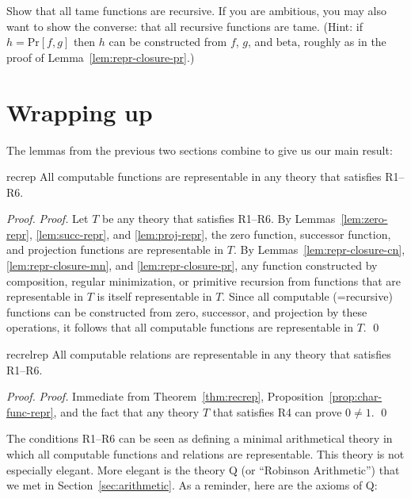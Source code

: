 \begin{exercise}
  Show that all tame functions are recursive.
  If you are ambitious, you may also want to show
  the converse: that all recursive functions are tame.
  (Hint: if $h = \mathrm{Pr}[f,g]$ then $h$ can be constructed from $f$, $g$, and $\mathrm{beta}$, roughly as in the proof of Lemma~\ref{lem:repr-closure-pr}.)
\end{exercise}

\section{Wrapping up}

The lemmas from the previous two sections combine to give us our main result:

\begin{theorem}{}{recrep}
  All computable functions are representable in any theory that satisfies R1--R6.
\end{theorem}
\begin{proof}
  \emph{Proof.}
  Let $T$ be any theory that satisfies R1--R6.
  By Lemmas~\ref{lem:zero-repr}, \ref{lem:succ-repr}, and \ref{lem:proj-repr},
  the zero function, successor function, and projection functions
  are representable in $T$.
  By Lemmas~\ref{lem:repr-closure-cn}, \ref{lem:repr-closure-mn},
  and \ref{lem:repr-closure-pr},
  any function constructed
  by composition, regular minimization, or primitive recursion
  from functions that are representable in $T$
  is itself representable in $T$.
  Since all computable (=recursive) functions can be constructed
  from zero, successor, and projection by these operations,
  it follows that all computable functions are representable in $T$.
  \qed
\end{proof}

\begin{theorem}{}{recrelrep}
  All computable relations are representable in any theory that satisfies R1--R6.
\end{theorem}
\begin{proof}
  \emph{Proof.}
  Immediate from Theorem~\ref{thm:recrep},
  Proposition~\ref{prop:char-func-repr},
  and the fact that any theory $T$ that satisfies R4 can prove $0 \neq \num{1}$.
  \qed
\end{proof}

The conditions R1--R6 can be seen as defining a minimal arithmetical theory
in which all computable functions and relations are representable.
This theory is not especially elegant.
More elegant is the theory Q (or ``Robinson Arithmetic'') that we met in Section~\ref{sec:arithmetic}.
As a reminder,
here are the axioms of Q:

